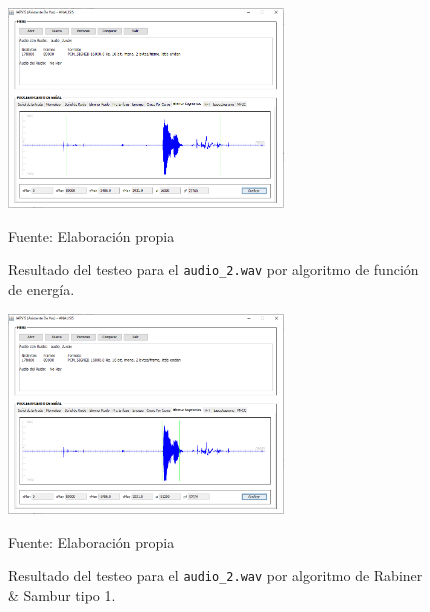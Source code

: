 \begin{figure}[H]
\begin{center}
\includegraphics[width=0.65\textwidth]{Imagenes/Cap3/image074}
\end{center}
\begin{center}
\vskip -0.5cm
\caption{\small{Resultado del testeo para el \texttt{audio\_2.wav} por algoritmo de función de energía.}}
\label{fig:figura3.74}
{\small{Fuente: Elaboración propia}}
\end{center}
\end{figure}

\begin{figure}[H]
\begin{center}
\includegraphics[width=0.65\textwidth]{Imagenes/Cap3/image075}
\end{center}
\begin{center}
\vskip -0.5cm
\caption{\small{Resultado del testeo para el \texttt{audio\_2.wav} por algoritmo de Rabiner \& Sambur tipo 1.}}
\label{fig:figura3.75}
{\small{Fuente: Elaboración propia}}
\end{center}
\end{figure}

\vskip -1cm

